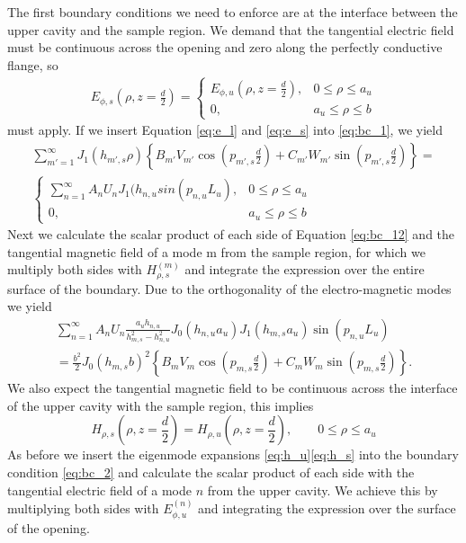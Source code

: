 The first boundary conditions we need to enforce are at the interface between the upper cavity and the sample region. We demand that the tangential electric field must be continuous across the opening and zero along the perfectly conductive flange, so
\begin{align}\label{eq:bc_1}
E_{\phi,s}\left(\rho,z=\frac{d}{2}\right)= \begin{cases}
    E_{\phi,u}(\rho,z=\frac{d}{2}) , & 0\leq\rho\leq a_u\\
    0, & a_u\leq\rho\leq b
  \end{cases}
\end{align}
must apply. If we insert Equation \eqref{eq:e_l} and \eqref{eq:e_s} into \eqref{eq:bc_1}, we yield
\begin{gather}\label{eq:bc_12}
\sum_{m'=1}^\infty J_1(h_{m',s}\rho)\left\{B_{m'}V_{m'}\cos\left(p_{m',s}\frac{d}{2}\right)+C_{m'}W_{m'}\sin\left(p_{m',s}\frac{d}{2}\right)\right\}=\nonumber\\ \begin{cases}
	\sum_{n=1}^\infty A_nU_nJ_1(h_{n,u}sin(p_{n,u}L_u),&0\leq\rho\leq a_u\\0,& a_u\leq\rho\leq b
\end{cases}
\end{gather}
Next we calculate the scalar product of each side of Equation \eqref{eq:bc_12} and the tangential magnetic field of a mode m from the sample region, for which we multiply both sides with $H_{\rho,s}^{(m)}$  and integrate the expression over the entire surface of the boundary. Due to the orthogonality of the electro-magnetic modes we yield
\begin{gather}
\sum_{n=1}^\infty A_nU_n\frac{a_uh_{n,u}}{h_{m,s}^2-h_{n,u}^2}J_0(h_{n,u}a_u)J_1(h_{m,s}a_u)\sin(p_{n,u}L_u)\nonumber\\=\frac{b^2}{2}J_0(h_{m,s}b)^2\left\{ B_mV_m\cos(p_{m,s}\frac{d}{2})+C_mW_m\sin(p_{m,s}\frac{d}{2})\right\}\text{.}\label{eq:mm_1}
\end{gather}
We also expect the tangential magnetic field to be continuous across the interface of the upper cavity with the sample region, this implies
\begin{equation}\label{eq:bc_2}
H_{\rho,s}\left(\rho,z=\frac{d}{2}\right)= H_{\rho,u}\left(\rho,z=\frac{d}{2}\right),\qquad 0\leq\rho\leq a_u
\end{equation}
As before we insert the eigenmode expansions \eqref{eq:h_u}\eqref{eq:h_s} into the boundary condition \eqref{eq:bc_2} and calculate the scalar product of each side with the tangential electric field of a mode $n$ from the upper cavity. We achieve this by multiplying both sides with $E_{\phi,u}^{(n)}$ and integrating the expression over the surface of the opening.

